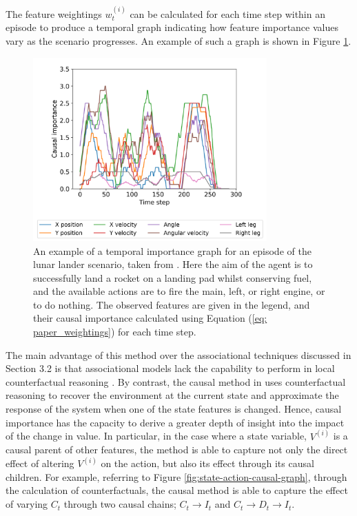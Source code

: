 \documentclass{article}
\begin{document}
The feature weightings $w_t^{(i)}$ can be calculated for each time step within an episode to produce a temporal graph indicating how feature importance values vary as the scenario progresses. An example of such a graph is shown in Figure \ref{fig:state-temporal-importance}.

\begin{figure}[ht]
    \centering
    \includegraphics[width=0.8\textwidth]{Images/state-temporal-importance.png}
    \caption{An example of a temporal importance graph for an episode of the lunar lander scenario, taken from \cite{wang2022causal}. Here the aim of the agent is to successfully land a rocket on a landing pad whilst conserving fuel, and the available actions are to fire the main, left, or right engine, or to do nothing. The observed features are given in the legend, and their causal importance calculated using Equation (\ref{eq: paper_weightings}) for each time step. } 
    \label{fig:state-temporal-importance}
\end{figure}

The main advantage of this method over the associational techniques discussed in Section 3.2 is that associational models lack the capability to perform in local counterfactual reasoning \cite{wang2022causal}. By contrast, the causal method in \cite{wang2022causal} uses counterfactual reasoning to recover the environment at the current state and approximate the response of the system when one of the state features is changed. Hence, causal importance has the capacity to derive a greater depth of insight into the impact of the change in value. In particular, in the case where a state variable, $V^{(i)}$ is a causal parent of other features, the method is able to capture not only the direct effect of altering $V^{(i)}$ on the action, but also its effect through its causal children. For example, referring to Figure \ref{fig:state-action-causal-graph}, through the calculation of counterfactuals, the causal method is able to capture the effect of varying $C_t$ through two causal chains; $C_t \rightarrow I_t$  and $C_t \rightarrow D_t \rightarrow I_t$.
\end{document}
